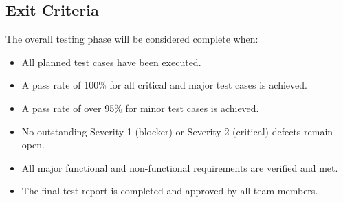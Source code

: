 \subsection{Exit Criteria}
The overall testing phase will be considered complete when:
\begin{itemize}
    \item All planned test cases have been executed.
    \item A pass rate of 100\% for all critical and major test cases is achieved.
    \item A pass rate of over 95\% for minor test cases is achieved.
    \item No outstanding Severity-1 (blocker) or Severity-2 (critical) defects remain open.
    \item All major functional and non-functional requirements are verified and met.
    \item The final test report is completed and approved by all team members.
\end{itemize}
